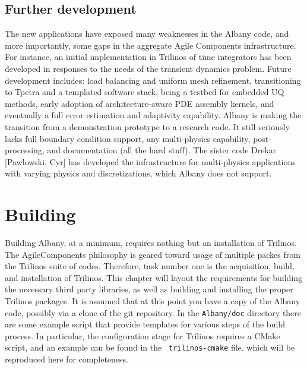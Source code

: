 \documentclass[pdf,12pt,report,strict]{SANDreport}
\theoremstyle{remark}
\begin{document}
\section{Further development}

The new applications have exposed many weaknesses in the Albany code,
and more importantly, some gaps in the aggregate Agile Components
infrastructure. For instance, an initial implementation in Trilinos of
time integrators has been developed in responses to the needs of the
transient dynamics problem. Future development includes: load
balancing and uniform mesh refinement, transitioning to Tpetra and a
templated software stack, being a testbed for embedded UQ methods,
early adoption of architecture-aware PDE assembly kernels, and
eventually a full error estimation and adaptivity capability. Albany
is making the transition from a demonstration prototype to a research
code. It still seriously lacks full boundary condition support, any
multi-physics capability, post-processing, and documentation (all the
hard stuff). The sister code Drekar [Pawlowski, Cyr] has developed the
infrastructure for multi-physics applications with varying physics and
discretizations, which Albany does not support.

\chapter{Building}
\label{build}

Building Albany, at a minimum, requires nothing but an installation of
Trilinos. The AgileComponents philosophy is geared toward usage of
multiple packes from the Trilinos suite of codes. Therefore, task
number one is the acquisition, build, and installation of
Trilinos. This chapter will layout the requirements for building the
necessary third party libraries, as well as building and installing
the proper Trilinos packages.  It is assumed that at this point you
have a copy of the Albany code, possibly via a clone of the git
repository. In the {\tt Albany/doc} directory there are some example
script that provide templates for various steps of the build
process. In particular, the configuration stage for Trilinos requires
a CMake script, and an example can be found in the {\tt
  trilinos-cmake} file, which will be reproduced here for
completeness.
\end{document}
